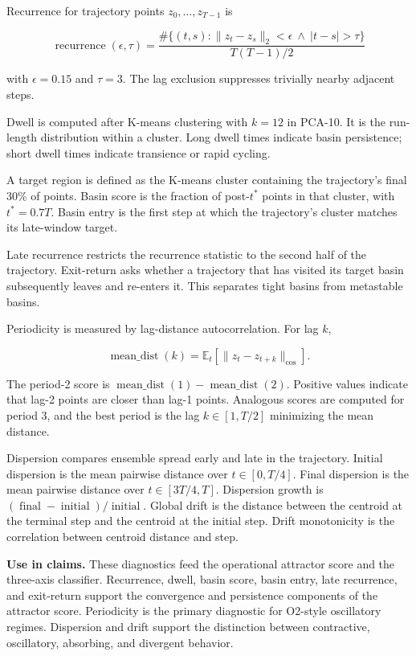 \documentclass{article}
\theoremstyle{plain}
\theoremstyle{definition}
\begin{document}
Recurrence for trajectory points \(z_0,\ldots,z_{T-1}\) is

\[\operatorname{recurrence}(\epsilon,\tau)=
\frac{\#\{(t,s):\lVert z_t-z_s\rVert_2<\epsilon\ \wedge\ |t-s|>\tau\}}
{T(T-1)/2}\]

with \(\epsilon=0.15\) and \(\tau=3\). The lag exclusion suppresses trivially nearby adjacent steps.

Dwell is computed after K-means clustering with \(k=12\) in PCA-10. It is the run-length distribution within a cluster. Long dwell times indicate basin persistence; short dwell times indicate transience or rapid cycling.

A target region is defined as the K-means cluster containing the trajectory's final 30\% of points. Basin score is the fraction of post-\(t^*\) points in that cluster, with \(t^*=0.7T\). Basin entry is the first step at which the trajectory's cluster matches its late-window target.

Late recurrence restricts the recurrence statistic to the second half of the trajectory. Exit-return asks whether a trajectory that has visited its target basin subsequently leaves and re-enters it. This separates tight basins from metastable basins.

Periodicity is measured by lag-distance autocorrelation. For lag \(k\),

\[\operatorname{mean\_dist}(k)=
\mathbb{E}_t\left[\lVert z_t-z_{t+k}\rVert_{\cos}\right].\]

The period-2 score is \(\operatorname{mean\_dist}(1)-\operatorname{mean\_dist}(2)\). Positive values indicate that lag-2 points are closer than lag-1 points. Analogous scores are computed for period 3, and the best period is the lag \(k\in[1,T/2]\) minimizing the mean distance.

Dispersion compares ensemble spread early and late in the trajectory. Initial dispersion is the mean pairwise distance over \(t\in[0,T/4]\). Final dispersion is the mean pairwise distance over \(t\in[3T/4,T]\). Dispersion growth is \((\operatorname{final}-\operatorname{initial})/\operatorname{initial}\). Global drift is the distance between the centroid at the terminal step and the centroid at the initial step. Drift monotonicity is the correlation between centroid distance and step.

\textbf{Use in claims.} These diagnostics feed the operational attractor score and the three-axis classifier. Recurrence, dwell, basin score, basin entry, late recurrence, and exit-return support the convergence and persistence components of the attractor score. Periodicity is the primary diagnostic for O2-style oscillatory regimes. Dispersion and drift support the distinction between contractive, oscillatory, absorbing, and divergent behavior.
\end{document}
